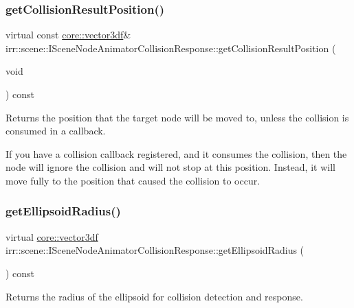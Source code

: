 \subsubsection{\texorpdfstring{get\+Collision\+Result\+Position()}{getCollisionResultPosition()}}
{\footnotesize\ttfamily virtual const \hyperlink{namespaceirr_1_1core_a06f169d08b5c429f5575acb7edbad811}{core\+::vector3df}\& irr\+::scene\+::\+I\+Scene\+Node\+Animator\+Collision\+Response\+::get\+Collision\+Result\+Position (\begin{DoxyParamCaption}\item[{void}]{ }\end{DoxyParamCaption}) const\hspace{0.3cm}{\ttfamily [pure virtual]}}



Returns the position that the target node will be moved to, unless the collision is consumed in a callback. 

If you have a collision callback registered, and it consumes the collision, then the node will ignore the collision and will not stop at this position. Instead, it will move fully to the position that caused the collision to occur. \mbox{\label{classirr_1_1scene_1_1ISceneNodeAnimatorCollisionResponse_a92965919db3dfbaab2d1f4987a2c52c1}} 
\subsubsection{\texorpdfstring{get\+Ellipsoid\+Radius()}{getEllipsoidRadius()}}
{\footnotesize\ttfamily virtual \hyperlink{namespaceirr_1_1core_a06f169d08b5c429f5575acb7edbad811}{core\+::vector3df} irr\+::scene\+::\+I\+Scene\+Node\+Animator\+Collision\+Response\+::get\+Ellipsoid\+Radius (\begin{DoxyParamCaption}{ }\end{DoxyParamCaption}) const\hspace{0.3cm}{\ttfamily [pure virtual]}}



Returns the radius of the ellipsoid for collision detection and response. 


